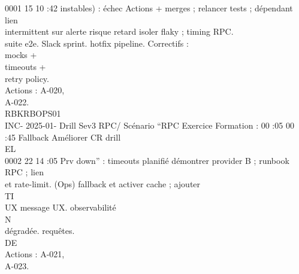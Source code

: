 0001 15 10 :42                          instables) : échec   Actions + merges ;                    relancer tests ;   dépendant         lien\\
intermittent sur     alerte    risque retard               isoler flaky ;     timing RPC.\\
suite e2e.           Slack     sprint.                     hotfix pipeline.   Correctifs :\\
mocks +\\
timeouts +\\
retry policy.\\
Actions : A-020,\\
A-022.\\
RBKRBOPS01\\
INC- 2025-01- Drill     Sev3    RPC/    Scénario “RPC    Exercice      Formation : 00 :05 00 :45 Fallback             Améliorer         CR drill\\
\vspace{0.5em}
\vspace{0.5em}
\vspace{0.5em}
\vspace{0.5em}
EL\\
0002 22 14 :05                  Prv     down” : timeouts planifié      démontrer                    provider B ;      runbook RPC ; lien\\
et rate-limit.   (Ops)         fallback et                  activer cache ; ajouter\\
\vspace{0.5em}
\vspace{0.5em}
\vspace{0.5em}
\vspace{0.5em}
TI\\
UX                           message UX.       observabilité\\
\vspace{0.5em}
\vspace{0.5em}
\vspace{0.5em}
\vspace{0.5em}
N\\
dégradée.                                      requêtes.\\
\vspace{0.5em}
\vspace{0.5em}
\vspace{0.5em}
\vspace{0.5em}
DE\\
Actions : A-021,\\
A-023.\\
